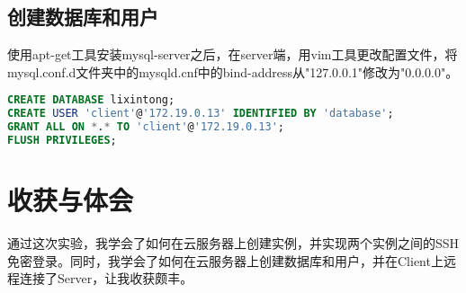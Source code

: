 \documentclass{article}
\begin{document}
\subsection{创建数据库和用户}

使用apt-get工具安装mysql-server之后，在server端，用vim工具更改配置文件，将mysql.conf.d文件夹中的mysqld.cnf中的bind-address从"127.0.0.1"修改为"0.0.0.0"。

\begin{lstlisting}[language=sql]
CREATE DATABASE lixintong;
CREATE USER 'client'@'172.19.0.13' IDENTIFIED BY 'database';
GRANT ALL ON *.* TO 'client'@'172.19.0.13';
FLUSH PRIVILEGES;
\end{lstlisting}

\section{收获与体会}

通过这次实验，我学会了如何在云服务器上创建实例，并实现两个实例之间的SSH免密登录。同时，我学会了如何在云服务器上创建数据库和用户，并在Client上远程连接了Server，让我收获颇丰。
\end{document}
